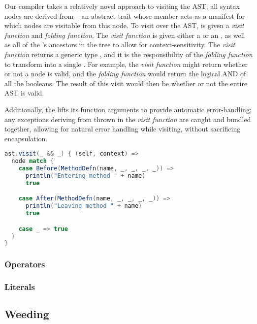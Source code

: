 \documentclass{article}
\begin{document}
Our compiler takes a relatively novel approach to visiting the AST; all syntax nodes are derived from 
-- an abstract trait whose \value{children} member acts as a manifest for which nodes are visitable from this node. To
visit over the AST,  is given a \textit{visit function} and \textit{folding function}. The \textit{visit
function} is given either a \value{Before(Node)} or an \value{After(Node)}, as well as all of the \value{Node}'s
ancestors in the tree to allow for context-sensitivity. The \textit{visit function} returns a generic type ,
and it is the responsibility of the \textit{folding function} to transform  into a single . For
example, the \textit{visit function} might return whether or not a node is valid, and the \textit{folding function}
would return the logical AND of all the booleans. The result of this visit would then be whether or not the entire AST
is valid.

Additionally, the \value{Visitor} lifts its function arguments to provide automatic error-handling; any exceptions
deriving from  thrown in the \textit{visit function} are caught and bundled together, allowing for
natural error handling while visiting, without sacrificing encapsulation.


\begin{lstlisting}[language=Scala]
ast.visit(_ && _) { (self, context) =>
  node match {
    case Before(MethodDefn(name, _, _, _, _)) =>
      println("Entering method " + name)
      true

    case After(MethodDefn(name, _, _, _, _)) =>
      println("Leaving method " + name)
      true

    case _ => true
  }
}


\end{lstlisting}




\subsubsection{Operators}

\subsubsection{Literals}






\subsection{Weeding}
\end{document}
